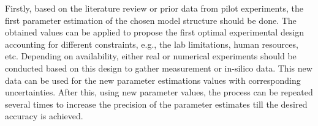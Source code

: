 \documentclass[10pt,A4paper]{article}
\begin{document}
Firstly, based on the literature review or prior data from pilot experiments, the first parameter estimation of the chosen model structure should be done.
The obtained values can be applied to propose the first optimal experimental design accounting for different constraints, e.g., the lab limitations, human resources, etc. 
Depending on availability, either real or numerical experiments should be conducted based on this design to gather measurement or in-silico data. 
This new data can be used for the new parameter estimations values with corresponding uncertainties.
After this, using new parameter values, the process can be repeated several times to increase the precision of the parameter estimates till the desired accuracy is achieved.
%
%
%
\end{document}
